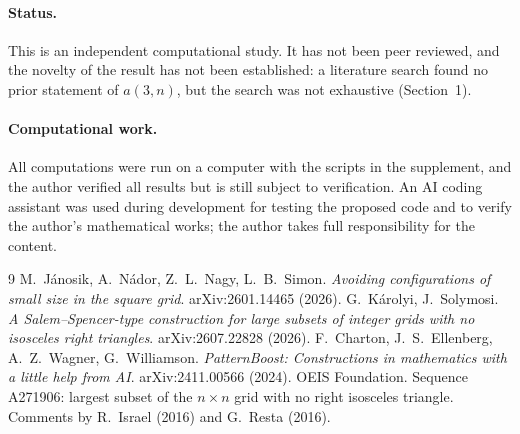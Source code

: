 \documentclass[11pt]{article}
\theoremstyle{definition}
\theoremstyle{remark}
\begin{document}
\paragraph{Status.} This is an independent computational study. It has not been peer reviewed, and the novelty of the result has not been established: a literature search found no prior statement of $a(3,n)$, but the search was not exhaustive (Section~1).

\paragraph{Computational work.} All computations were run on a computer with the scripts in the supplement, and the author verified all results but is still subject to verification. An AI coding assistant was used during development for testing the proposed code and to verify the author's mathematical works; the author takes full responsibility for the content.

\begin{thebibliography}{9}
 M.~Jánosik, A.~Nádor, Z.~L.~Nagy, L.~B.~Simon. \emph{Avoiding configurations of small size in the square grid}. arXiv:2601.14465 (2026).
 G.~Károlyi, J.~Solymosi. \emph{A Salem--Spencer-type construction for large subsets of integer grids with no isosceles right triangles}. arXiv:2607.22828 (2026).
 F.~Charton, J.~S.~Ellenberg, A.~Z.~Wagner, G.~Williamson. \emph{PatternBoost: Constructions in mathematics with a little help from AI}. arXiv:2411.00566 (2024).
 OEIS Foundation. Sequence A271906: largest subset of the $n\times n$ grid with no right isosceles triangle. Comments by R.~Israel (2016) and G.~Resta (2016).
\end{thebibliography}
\end{document}
